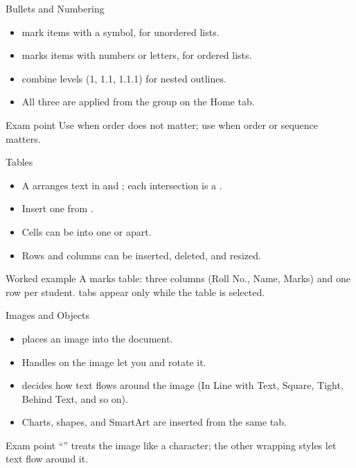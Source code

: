 \documentclass[aspectratio=169]{beamer}
\begin{document}
\begin{frame}{Bullets and Numbering}
  \begin{itemize}
    \item {} mark items with a symbol, for unordered lists.
    \item {} marks items with numbers or letters, for ordered
      lists.
    \item {} combine levels (1, 1.1, 1.1.1) for nested
      outlines.
    \item All three are applied from the  group on the Home
      tab.
  \end{itemize}
  \begin{alertblock}{Exam point}
    Use  when order does not matter; use  when
    order or sequence matters.
  \end{alertblock}
\end{frame}

\begin{frame}{Tables}
  \begin{itemize}
    \item A  arranges text in  and ; each
      intersection is a .
    \item Insert one from .
    \item Cells can be  into one or  apart.
    \item Rows and columns can be inserted, deleted, and resized.
  \end{itemize}
  \begin{exampleblock}{Worked example}
    A marks table: three columns (Roll No., Name, Marks) and one row per
    student.  tabs appear only while the table is selected.
  \end{exampleblock}
\end{frame}

\begin{frame}{Images and Objects}
  \begin{itemize}
    \item {} places an image into the
      document.
    \item Handles on the image let you  and rotate it.
    \item {} decides how text flows around the image
      (In Line with Text, Square, Tight, Behind Text, and so on).
    \item Charts, shapes, and SmartArt are inserted from the same
       tab.
  \end{itemize}
  \begin{alertblock}{Exam point}
    ``'' treats the image like a character; the other
    wrapping styles let text flow around it.
  \end{alertblock}
\end{frame}
\end{document}
